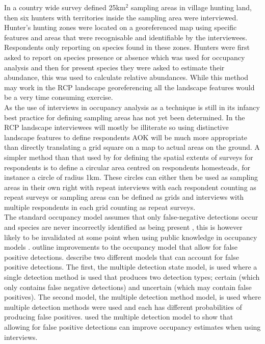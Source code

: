 In a country wide survey \cite{Mart_nez_Mart__2016} defined 25km$^2$ sampling areas in village hunting land, then six hunters with territories inside the sampling area were interviewed. Hunter's hunting zones were located on a georeferenced map using specific features and areas that were recognisable and identifiable by the interviewees. Respondents only reporting on species found in these zones. Hunters were first asked to report on species presence or absence which was used for occupancy analysis and then for present species they were asked to estimate their abundance, this was used to calculate relative abundances. While this method may work in the RCP landscape georeferencing all the landscape features would be a very time consuming exercise.\\

As the use of interviews in occupancy analysis as a technique is still in its infancy best practice for defining sampling areas has not yet been determined. In the RCP landscape interviewees will mostly be illiterate so using distinctive landscape features to define respondents AOK will be much more appropriate than directly translating a grid square on a map to actual areas on the ground. A simpler method than that used by \cite{Mart_nez_Mart__2016} for defining the spatial extents of surveys for respondents is to define a circular area centred on respondents homesteads, for instance a circle of radius 1km. These circles can either then be used as sampling areas in their own right with repeat interviews with each respondent counting as repeat surveys or sampling areas can be defined as grids and interviews with multiple respondents in each grid counting as repeat surveys.\\

The standard occupancy model assumes that only false-negative detections occur and species are never incorrectly identified as being present \cite{mackenzie2017occupancy}, this is however likely to be invalidated at some point when using public knowledge in occupancy models \cite{Pillay2013}. \citet{Miller_2011} outline improvements to the occupancy model that allow for false positive detections. \citet{Miller_2011} describe two different models that can account for false positive detections. The first, the multiple detection state model, is used where a single detection method is used that produces two detection types; certain (which only contains false negative detections) and uncertain (which may contain false positives). The second model, the multiple detection method model, is used where multiple detection methods were used and each has different probabilities of producing false positives. \cite{Pillay2013} used the multiple detection model to show that allowing for false positive detections can improve occupancy estimates when using interviews.

